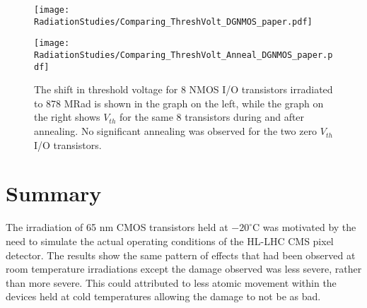 \begin{figure}[htb!]
\begin{minipage}[b]{0.5\textwidth}
	\centering
	\texttt{[image: RadiationStudies/Comparing\_ThreshVolt\_DGNMOS\_paper.pdf]}
\end{minipage}
\hspace{0.5cm}
\begin{minipage}[b]{0.5\textwidth}
	\centering
	\texttt{[image: RadiationStudies/Comparing\_ThreshVolt\_Anneal\_DGNMOS\_paper.pdf]}
\end{minipage}
\caption{The shift in threshold voltage for 8 NMOS I/O transistors irradiated to 878 MRad is shown in the graph on the left, while the graph on the right shows $V_{th}$ for the same 8 transistors during and after annealing.  No significant annealing was observed for the two zero $V_{th}$ I/O transistors.}
\label{fig:DGNMOS_Vth}
\end{figure}

\section{Summary}

The irradiation of 65 nm CMOS transistors held at $-20^{\circ}\mathrm{C}$ was motivated by the need to simulate the actual operating conditions of the HL-LHC CMS pixel detector. The results show the same pattern of effects that had been observed at room temperature irradiations except the damage observed was less severe, rather than more severe. This could attributed to less atomic movement within the devices held at cold temperatures allowing the damage to not be as bad.

















